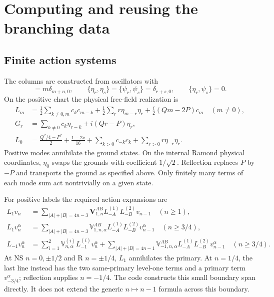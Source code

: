 \documentclass[11pt]{article}
\numberwithin{equation}{section}
\begin{document}
\section{Computing and reusing the branching data}
\label{sec:branching}

\subsection{Finite action systems}
The columns are constructed from oscillators with
\begin{equation}
 [c_m,c_n]=m\delta_{m+n,0},\qquad
 \{\eta_r,\eta_s\}=\{\psi_r,\psi_s\}=\delta_{r+s,0},\qquad
 \{\eta_r,\psi_s\}=0.
\end{equation}
On the positive chart the physical free-field realization is
\begin{align}
 L_m&=\frac12\sum_{k\ne0,m}c_kc_{m-k}
       +\frac12\sum_r r\eta_{m-r}\eta_r
       +\frac i2(Qm-2P)c_m\quad(m\ne0),\\
 G_r&=\sum_{k\ne0}c_k\eta_{r-k}+i(Qr-P)\eta_r,\\
 L_0&=\frac{Q^2/4-P^2}{2}+\frac{1-2\nu}{16}
       +\sum_{k>0}c_{-k}c_k+\sum_{r>0}r\eta_{-r}\eta_r.
\end{align}
Positive modes annihilate the ground states. On the internal Ramond physical
coordinates, $\eta_0$ swaps the grounds with coefficient $1/\sqrt2$.
Reflection replaces $P$ by $-P$ and transports the ground as specified above.
Only finitely many terms of each mode sum act nontrivially on a given state.

For positive labels the required action expansions are
\begin{align}
 L_1v_n&=\sum_{|A|+|B|=4n-3}\mathbf V_{1,n}^{AB}
                 L_{-A}^{(1)}L_{-B}^{(2)}v_{n-1}\quad(n\ge1),\\
 L_1v_n^\alpha&=\sum_{|A|+|B|=4n-3}\mathbb V_{1,n,\alpha}^{AB}
                 L_{-A}^{(1)}L_{-B}^{(2)}v_{n-1}^\alpha\quad(n\ge3/4),\\
 L_{-1}v_n^\alpha&=\sum_{i=1}^2\mathbb V_{n,\alpha}^{(i)}L_{-1}^{(i)}v_n^\alpha
 +\sum_{|A|+|B|=4n-1}\mathbb V_{-1,n,\alpha}^{AB}
                 L_{-A}^{(1)}L_{-B}^{(2)}v_{n-1}^\alpha\quad(n\ge3/4).
 \label{eq:actions}
\end{align}
At NS $n=0,\pm1/2$ and R $n=\pm1/4$, $L_1$ annihilates the primary.
At $n=1/4$, the last line instead has the two same-primary level-one terms
and a primary term $v_{-3/4}^\alpha$; reflection supplies $n=-1/4$.
The code constructs this small boundary span directly. It does not extend
the generic $n\mapsto n-1$ formula across this boundary.
\end{document}
